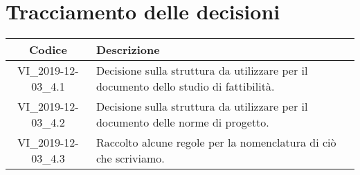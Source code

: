 \section*{Tracciamento delle decisioni}

\begin{center}
	\begin{longtable}{|c|p{12.25cm}|}
	\hline
	\rowcolor{lighter-grayer}
	\textbf{Codice} & \textbf{Descrizione} \\
	\hline
	\endfirsthead

	\hline
	VI\_2019-12-03\_4.1 & Decisione sulla struttura da utilizzare per il documento dello studio di fattibilità. \\
	VI\_2019-12-03\_4.2 & Decisione sulla struttura da utilizzare per il documento delle norme di progetto. \\
	VI\_2019-12-03\_4.3 & Raccolto alcune regole per la nomenclatura di ciò che scriviamo. \\
	\hline

	\end{longtable}
\end{center}
